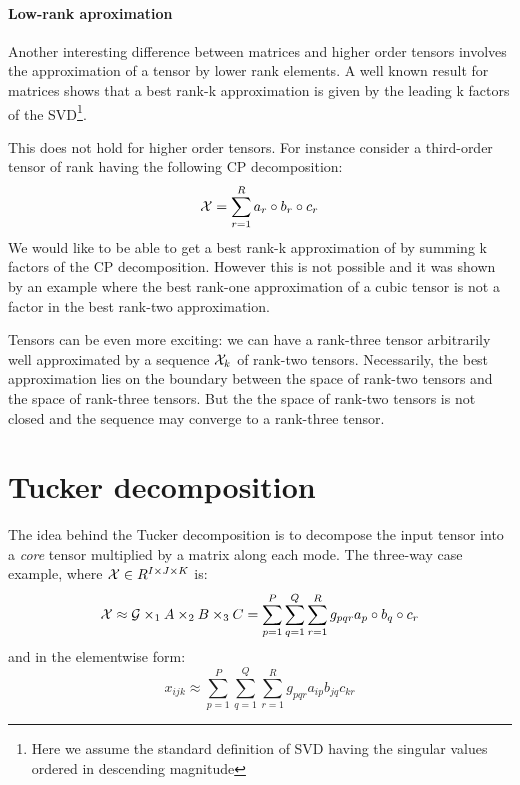 \paragraph{Low-rank aproximation}
Another interesting difference between matrices and higher order tensors involves the approximation of a tensor by lower rank elements.
A well known result for matrices \cite{SVDbestapprox} shows that a best rank-k approximation is given by the leading k factors of the SVD\footnote{Here we assume the standard definition of SVD having the singular values ordered in descending magnitude}.

This does not hold for higher order tensors. For instance consider a third-order tensor of rank \R having the following CP decomposition:
\begin{equation*}
  \mathcal{X} = \sum_{r=1}^R a_r \circ b_r \circ c_r
\end{equation*}
We would like to be able to get a best rank-k approximation of \X by summing k factors of the CP decomposition. However this is not possible and it was shown by an example \cite{kolda2001orthogonal} where the best rank-one approximation of a cubic tensor is not a factor in the best rank-two approximation.

Tensors can be even more exciting: we can have a rank-three tensor \X arbitrarily well approximated by a sequence ${\mathcal{X}_k}$ of rank-two tensors. Necessarily, the best approximation lies on the boundary between the space of rank-two tensors and the space of rank-three tensors. But the the space of rank-two tensors is not closed and the sequence may converge to a rank-three tensor.  %

\section{Tucker decomposition}
The idea behind the Tucker decomposition is to decompose the input tensor into a \emph{core} tensor multiplied by a matrix along each mode.
The three-way case example, where $\mathcal{X} \in R^{I \times J \times K}$ is:
\begin{equation*}
  \mathcal{X} \approx \mathcal{G} \times_1 A \times_2 B \times_3 C = \sum_{p=1}^P \sum_{q=1}^Q \sum_{r=1}^R g_{pqr} a_p \circ b_q \circ c_r
\end{equation*}
and in the elementwise form:
\begin{equation*}
  x_{ijk} \approx \sum_{p=1}^P \sum_{q=1}^Q \sum_{r=1}^R g_{pqr} a_{ip} b_{jq} c_{kr}
\end{equation*}

